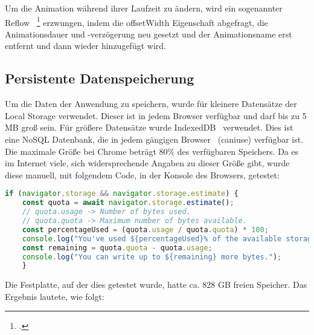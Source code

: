 \newline
\newline
Um die Animation während ihrer Laufzeit zu ändern, wird ein sogenannter Reflow ~\footcite{JavaScriptAnimationsReflow} erzwungen, indem die offsetWidth Eigenschaft abgefragt, die Animationsdauer und -verzögerung neu gesetzt und der Animationsname erst entfernt und dann wieder hinzugefügt wird.
\newline
\newline
\subsection{Persistente Datenspeicherung}\label{subsec:persistente-datenspeicherung}
Um die Daten der Anwendung zu speichern, wurde für kleinere Datensätze der Local Storage verwendet.
Dieser ist in jedem Browser verfügbar und darf bis zu 5 MB groß sein.
\newline
\newline
Für größere Datensätze wurde IndexedDB~\cite{IndexedDB} verwendet.
Dies ist eine NoSQL Datenbank, die in jedem gängigen Browser~\cite{caniuse-indexedDB} (\gls{caniuse}) verfügbar ist.
Die maximale Größe bei Chrome beträgt 80\(\%\) des verfügbaren Speichers.
Da es im Internet viele, sich widersprechende Angaben zu dieser Größe gibt, wurde diese manuell, mit folgendem Code, in der Konsole des Browsers, getestet:
\newline
\newline
\begin{lstlisting}[language=JavaScript,label={lst:JavaScript IndexedDB Speichergröße}]
    if (navigator.storage && navigator.storage.estimate) {
    const quota = await navigator.storage.estimate();
    // quota.usage -> Number of bytes used.
    // quota.quota -> Maximum number of bytes available.
    const percentageUsed = (quota.usage / quota.quota) * 100;
    console.log("You've used ${percentageUsed}% of the available storage.");
    const remaining = quota.quota - quota.usage;
    console.log("You can write up to ${remaining} more bytes.");
    }
\end{lstlisting}
\newline
\newline
Die Festplatte, auf der dies getestet wurde, hatte ca. 828 GB freien Speicher.
Das Ergebnis lautete, wie folgt:
\newline
